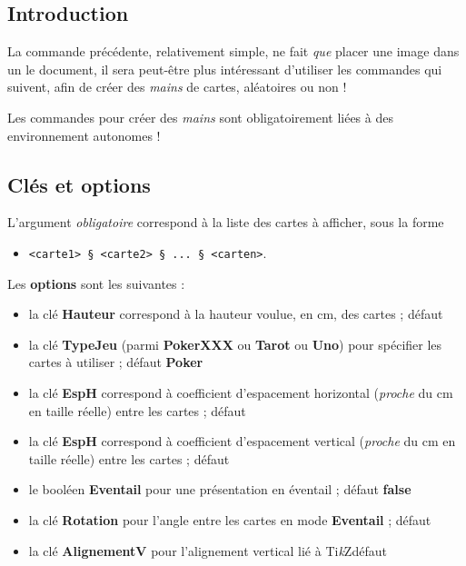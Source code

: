 \documentclass{article}
\providecommand\tikzlogo{Ti\textit{k}Z}
\let\TikZ\tikzlogo
\newcommand\ctex[1]{\tcbox[vignettelatex]{#1}}
\newcommand\Cle[1]{{\bfseries\sffamily\textlangle #1\textrangle}}
\begin{document}
{{{{{{{\subsection{Introduction}

\begin{codeidee}
La commande précédente, relativement simple, ne fait \textit{que} placer une image dans un le document, il sera peut-être plus intéressant d'utiliser les commandes qui suivent, afin de créer des \textit{mains} de cartes, aléatoires ou non !
\end{codeidee}

\begin{codeattention}
Les commandes pour créer des \textit{mains} sont obligatoirement liées à des environnement \ctex{tikzpicture} autonomes !
\end{codeattention}

\begin{codetex}
\end{codetex}

\subsection{Clés et options}

\begin{codecles}
L'argument \textit{obligatoire} correspond à la liste des cartes à afficher, sous la forme 

\begin{itemize}
	\item \texttt{<carte1> § <carte2> § ... § <carten>}.
\end{itemize}

Les \Cle{options} sont les suivantes :

\begin{itemize}
	\item la clé \Cle{Hauteur} correspond à la hauteur voulue, en cm, des cartes ; \hfill{}défaut \Cle{4.25}
	\item la clé \Cle{TypeJeu} (parmi \Cle{PokerXXX} ou \Cle{Tarot} ou \Cle{Uno}) pour spécifier les cartes à utiliser ; \hfill{}défaut \Cle{Poker}
	\item la clé \Cle{EspH} correspond à coefficient d'espacement horizontal (\textit{proche} du cm en taille réelle) entre les cartes ; \hfill{}défaut \Cle{1}
	\item la clé \Cle{EspH} correspond à coefficient d'espacement vertical (\textit{proche} du cm en taille réelle) entre les cartes ; \hfill{}défaut \Cle{0}
	\item le booléen \Cle{Eventail} pour une présentation en éventail ; \hfill{}défaut \Cle{false}
	\item la clé \Cle{Rotation} pour l'angle entre les cartes en mode \Cle{Eventail}  ; \hfill{}défaut \Cle{10}
	\item la clé \Cle{AlignementV} pour l'alignement vertical lié à \TikZ{}\hfill{}défaut \Cle{0.5}
\end{itemize}
\end{codecles}

}}}}}}}
\end{document}
